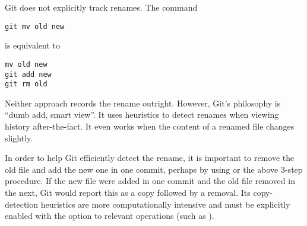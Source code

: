 Git does not explicitly track renames. The command

\begin{verbatim}
git mv old new
\end{verbatim}

is equivalent to

\begin{verbatim}
mv old new
git add new
git rm old
\end{verbatim}

Neither approach records the rename outright. However, Git's philosophy is
``dumb add, smart view''. It uses heuristics to detect renames when viewing
history after-the-fact. It even works when the content of a renamed file changes
slightly.

In order to help Git efficiently detect the rename, it is important to remove
the old file and add the new one in one commit, perhaps by using 
or the above 3-step procedure. If the new file were added in one commit and the
old file removed in the next, Git would report this as a copy followed by a
removal. Its copy-detection heuristics are more computationally intensive and
must be explicitly enabled with the  option to relevant operations
(such as ).
